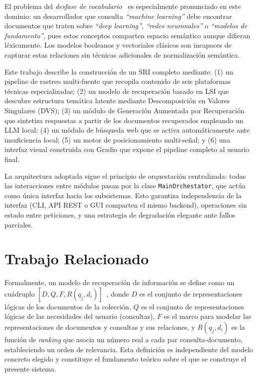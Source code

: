 \documentclass[runningheads,a4paper]{llncs}
\begin{document}
El problema del \emph{desfase de vocabulario}~\cite{deerwester1990} es especialmente pronunciado en este dominio: un desarrollador que consulta \emph{``machine learning''} debe encontrar documentos que traten sobre \emph{``deep learning''}, \emph{``redes neuronales''} o \emph{``modelos de fundamento''}, pues estos conceptos comparten espacio semántico aunque difieran léxicamente. Los modelos booleanos y vectoriales clásicos son incapaces de capturar estas relaciones sin técnicas adicionales de normalización semántica.

Este trabajo describe la construcción de un SRI completo mediante: (1) un pipeline de rastreo multi-fuente que recopila contenido de seis plataformas técnicas especializadas; (2) un modelo de recuperación basado en LSI que descubre estructura temática latente mediante Descomposición en Valores Singulares (DVS); (3) un módulo de Generación Aumentada por Recuperación que sintetiza respuestas a partir de los documentos recuperados empleando un LLM local; (4) un módulo de búsqueda web que se activa automáticamente ante insuficiencia local; (5) un motor de posicionamiento multi-señal; y (6) una interfaz visual construida con Gradio que expone el pipeline completo al usuario final.

La arquitectura adoptada sigue el principio de orquestación centralizada: todas las interacciones entre módulos pasan por la clase \texttt{MainOrchestator}, que actúa como única interfaz hacia los subsistemas. Esto garantiza independencia de la interfaz (CLI, API REST o GUI comparten el mismo backend), operaciones sin estado entre peticiones, y una estrategia de degradación elegante ante fallos parciales.

\section{Trabajo Relacionado}

Formalmente, un modelo de recuperación de información se define como un cuádruplo $[D, Q, F, R(q_j, d_i)]$~\cite{baezayates1999}, donde $D$ es el conjunto de representaciones lógicas de los documentos de la colección, $Q$ es el conjunto de representaciones lógicas de las necesidades del usuario (consultas), $F$ es el marco para modelar las representaciones de documentos y consultas y sus relaciones, y $R(q_j, d_i)$ es la función de \emph{ranking} que asocia un número real a cada par consulta-documento, estableciendo un orden de relevancia. Esta definición es independiente del modelo concreto elegido y constituye el fundamento teórico sobre el que se construye el presente sistema.
\end{document}
